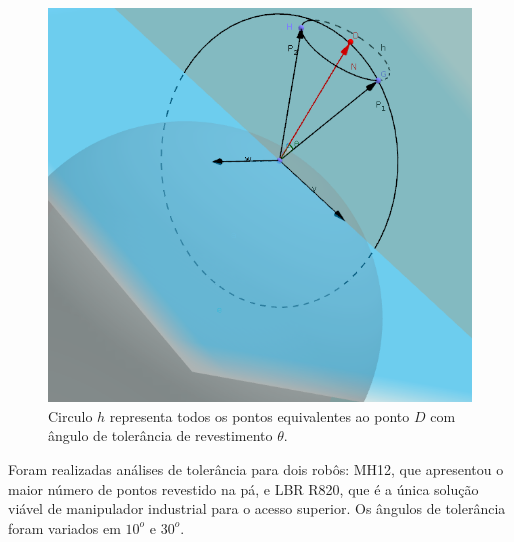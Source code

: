 \begin{figure}[h!]	
	\centering
	\includegraphics[width=0.6\columnwidth]{detail/figs/bighatch/tolerancia4.png}
	\caption{Circulo $h$ representa todos os pontos equivalentes ao ponto $D$ com
	ângulo de tolerância de revestimento $\theta$.}
	\label{fig::tolerancia4}
\end{figure}

Foram realizadas análises de tolerância para dois robôs: MH12, que apresentou o
maior número de pontos revestido na pá, e LBR R820, que é a única solução viável
de manipulador industrial para o acesso superior. Os ângulos de tolerância foram
variados em $10^o$ e $30^o$. 
